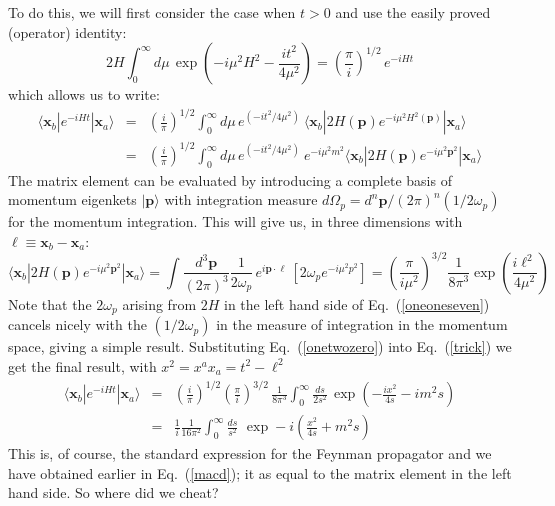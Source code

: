 \documentclass[12pt]{article}
\def\eq#1{{Eq.~(\ref{#1})}}
\def\frab#1#2{\left(\frac{#1}{#2}\right)}
\def\ket#1{|#1\rangle}                    %
\def\bk#1#2#3{{\langle #1|#2|#3\rangle}}  %
\begin{document}
To do this, we will first consider the case when $t>0$ and use the easily proved (operator) identity:
\begin{equation}
 2H\int_0^\infty d\mu \, \exp\left( - i\mu^2 H^2 - \frac{i t^2}{4\mu^2}\right) =  \frab{\pi}{i}^{1/2}\,  e^{-iHt}
 \label{oneoneseven}
\end{equation} 
which allows us to  write:
\begin{eqnarray}
 \bk{\bm{x}_b}{e^{-iHt}}{\bm{x}_a} &=&  \frab{i}{\pi}^{1/2}  \int_0^\infty d\mu \, e^{(-it^2/4\mu^2)}\ \bk{\bm{x}_b}{2H(\bm{p}) e^{-i\mu^2H^2(\bm{p})}}{\bm{x}_a}\nonumber\\
 &=&\frab{i}{\pi}^{1/2}  \int_0^\infty d\mu \, e^{(-it^2/4\mu^2)}\ e^{-i\mu^2m^2}\bk{\bm{x}_b}{2H(\bm{p}) e^{-i\mu^2\bm{p}^2}}{\bm{x}_a}
 \label{trick}
\end{eqnarray} 
The matrix element can be evaluated by introducing a complete basis of momentum eigenkets $\ket{\bm{p}}$ with integration measure $d\Omega_p=d^n\bm{p}/(2\pi)^n(1/2\omega_p)$ for the momentum integration. This will give us, in three dimensions with $\bm{\ell} \equiv \bm{x}_b - \bm{x}_a$:
\begin{equation}
\bk{\bm{x}_b}{2H(\bm{p})e^{-i\mu^2\bm{p}^2}}{\bm{x}_a} =
  \int \frac{d^3\bm{p}}{(2\pi)^3}\frac{1}{2\omega_p} \, e^{i\bm{p}\cdot  \bm{\ell}} \, [2\omega_p e^{-i \mu^2 p^2}] = \frab{\pi}{i\mu^2}^{3/2} \frac{1}{8\pi^3}\exp \left(\frac{i\bm{\ell}^2}{4\mu^2}\right)
  \label{onetwozero}
\end{equation} 
Note that the $2\omega_p$ arising from $2H$ in the left hand side of \eq{oneoneseven} cancels nicely with the $(1/2\omega_p)$ in the measure of integration in the momentum space, giving a simple result. Substituting \eq{onetwozero}
into \eq{trick} we get the final result, with $x^2 = x^ax_a=t^2  - \bm{\ell}^2$
\begin{eqnarray}
  \bk{\bm{x}_b}{e^{-iHt}}{\bm{x}_a} &=&  \frab{i}{\pi}^{1/2}  \frab{\pi}{i}^{3/2}\,\frac{1}{8\pi^3}\int_0^\infty \frac{ds}{2s^2} \, \exp\left( - \frac{ix^2}{4 s} - i m^2 s\right)\\
  &=& \frac{1}{i} \frac{1}{16\pi^2} \int_0^\infty\frac{ds}{s^2} \, \, \exp -i\left( \frac{x^2}{4 s} +  m^2 s\right)
  \label{oneoneight}
\end{eqnarray}
This is, of course, the standard expression for the Feynman propagator and we have obtained earlier in \eq{macd}; it as equal to the matrix element in the left hand side. So where did we cheat? 
\end{document}
